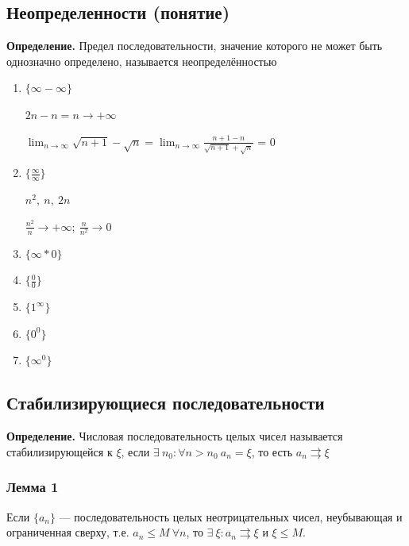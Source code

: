 \documentclass{article}
\begin{document}
    \subsection{Неопределенности (понятие)}
    
    \textbf{Определение.} Предел последовательности, значение которого не может быть однозначно определено, называется неопределённостью

    \begin{enumerate}
    	\item \(\{\infty - \infty\}\)
    	
    	\(2n - n = n \rightarrow +\infty\)
    	
        \(\lim_{n \rightarrow \infty}{\sqrt{n+1} - \sqrt{n}} = \lim_{n \rightarrow \infty}{\frac{n+1-n}{\sqrt{n+1}+\sqrt{n}}}\) = 0

    	\item \(\{\frac{\infty}{\infty}\}\)

    	\( n^2,\ n,\ 2n \)
    
    	\( \frac{n^2}{n}  \rightarrow +\infty;\ \frac{n}{n^2} \rightarrow 0\)

    	\item \(\{\infty * 0\}\)
    	\item \(\{\frac{0}{0}\}\)
    	
    	\item \(\{1^{\infty}\}\)
    	\item \(\{0^0\}\)
    	\item \(\{\infty^0\}\)
    \end{enumerate}
    
    \subsection{Стабилизирующиеся последовательности}
    
    \textbf{Определение.}
    Числовая последовательность целых чисел называется стабилизирующейся к \(\xi\), если \( \exists\ n_0 : \forall n > n_0\  a_n = \xi\), то есть \(a_n \rightrightarrows \xi \)
    
    \subsubsection{Лемма 1}
    
    Если \(\{a_n\}\) --- последовательность целых неотрицательных чисел, неубывающая и ограниченная сверху, т.е. \( a_n \leq M\ \forall n\), то \( \exists\ \xi: a_n \rightrightarrows \xi \) и \( \xi \leq M \).
\end{document}

